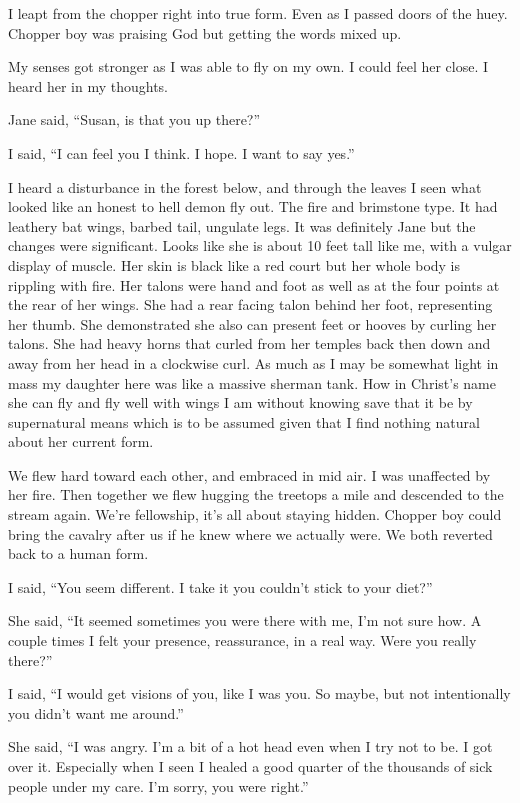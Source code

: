 I leapt from the chopper right into true form. Even as I passed doors of the huey. Chopper boy was praising God but getting the words mixed up.

My senses got stronger as I was able to fly on my own. I could feel her close. I heard her in my thoughts.

Jane said, ``Susan, is that you up there?''

I said, ``I can feel you I think. I hope. I want to say yes.''

I heard a disturbance in the forest below, and through the leaves I seen what looked like an honest to hell demon fly out. The fire and brimstone type. It had leathery bat wings, barbed tail, ungulate legs. It was definitely Jane but the changes were significant. Looks like she is about 10 feet tall like me, with a vulgar display of muscle. Her skin is black like a red court but her whole body is rippling with fire. Her talons were hand and foot as well as at the four points at the rear of her wings. She had a rear facing talon behind her foot, representing her thumb. She demonstrated she also can present feet or hooves by curling her talons. She had heavy horns that curled from her temples back then down and away from her head in a clockwise curl. As much as I may be somewhat light in mass my daughter here was like a massive sherman tank. How in Christ's name she can fly and fly well with wings I am without knowing save that it be by supernatural means which is to be assumed given that I find nothing natural about her current form.

We flew hard toward each other, and embraced in mid air. I was unaffected by her fire. Then together we flew hugging the treetops a mile and descended to the stream again. We're fellowship, it's all about staying hidden. Chopper boy could bring the cavalry after us if he knew where we actually were. We both reverted back to a human form.

I said, ``You seem different. I take it you couldn't stick to your diet?''

She said, ``It seemed sometimes you were there with me, I'm not sure how. A couple times I felt your presence, reassurance, in a real way. Were you really there?''

I said, ``I would get visions of you, like I was you. So maybe, but not intentionally you didn't want me around.''

She said, ``I was angry. I'm a bit of a hot head even when I try not to be. I got over it. Especially when I seen I healed a good quarter of the thousands of sick people under my care. I'm sorry, you were right.''

